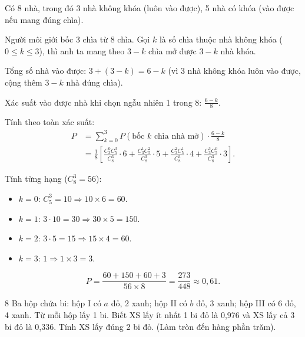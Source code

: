 \begin{loigiai}
Có 8 nhà, trong đó 3 nhà không khóa (luôn vào được), 5 nhà có khóa (vào được nếu mang đúng chìa).

Người môi giới bốc 3 chìa từ 8 chìa. Gọi $k$ là số chìa thuộc nhà không khóa ($0 \le k \le 3$), thì anh ta mang theo $3-k$ chìa mở được $3-k$ nhà khóa.

Tổng số nhà vào được: $3 + (3-k) = 6 - k$ (vì 3 nhà không khóa luôn vào được, cộng thêm $3-k$ nhà đúng chìa).

Xác suất vào được nhà khi chọn ngẫu nhiên 1 trong 8: $\frac{6-k}{8}$.

Tính theo toàn xác suất:
\begin{align*}
P &= \sum_{k=0}^{3} P(\text{bốc }k\text{ chìa nhà mở}) \cdot \frac{6-k}{8} \\
  &= \frac{1}{8} \left[ \frac{C_3^0 C_5^3}{C_8^3} \cdot 6 + \frac{C_3^1 C_5^2}{C_8^3} \cdot 5 + \frac{C_3^2 C_5^1}{C_8^3} \cdot 4 + \frac{C_3^3 C_5^0}{C_8^3} \cdot 3 \right].
\end{align*}

Tính từng hạng ($C_8^3 = 56$):
\begin{itemize}
  \item $k = 0$: $C_5^3 = 10 \Rightarrow 10 \times 6 = 60$.
  \item $k = 1$: $3 \cdot 10 = 30 \Rightarrow 30 \times 5 = 150$.
  \item $k = 2$: $3 \cdot 5 = 15 \Rightarrow 15 \times 4 = 60$.
  \item $k = 3$: $1 \Rightarrow 1 \times 3 = 3$.
\end{itemize}

\[ P = \frac{60 + 150 + 60 + 3}{56 \times 8} = \frac{273}{448} \approx \boxed{0{,}61}. \]
\end{loigiai}

\separator

\begin{baitoan}{8 \hfill {}}
Ba hộp chứa bi: hộp I có $a$ đỏ, 2 xanh; hộp II có $b$ đỏ, 3 xanh; hộp III có 6 đỏ, 4 xanh. Từ mỗi hộp lấy 1 bi. Biết XS lấy ít nhất 1 bi đỏ là 0,976 và XS lấy cả 3 bi đỏ là 0,336. Tính XS lấy đúng 2 bi đỏ. (Làm tròn đến hàng phần trăm).
\end{baitoan}

